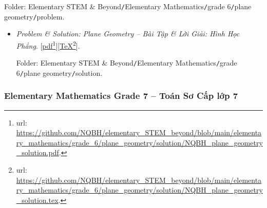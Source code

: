 \documentclass[12pt,twoside]{book}
\begin{document}
\begin{enumerate}
	Folder: {\sf Elementary STEM \& Beyond{\tt/}Elementary Mathematics{\tt/}grade 6{\tt/}plane geometry{\tt/}problem}.
	\begin{itemize}
		\item {\it Problem \& Solution: Plane Geometry -- Bài Tập \& Lời Giải: Hình Học Phẳng}. [\href{https://github.com/NQBH/elementary_STEM_beyond/blob/main/elementary_mathematics/grade_6/plane_geometry/solution/NQBH_plane_geometry_solution.pdf}{pdf}\footnote{{\sc url}: \url{https://github.com/NQBH/elementary_STEM_beyond/blob/main/elementary_mathematics/grade_6/plane_geometry/solution/NQBH_plane_geometry_solution.pdf}.}][\href{https://github.com/NQBH/elementary_STEM_beyond/blob/main/elementary_mathematics/grade_6/plane_geometry/solution/NQBH_plane_geometry_solution.tex}{\TeX}\footnote{{\sc url}: \url{https://github.com/NQBH/elementary_STEM_beyond/blob/main/elementary_mathematics/grade_6/plane_geometry/solution/NQBH_plane_geometry_solution.tex}.}].
		
		Folder: {\sf Elementary STEM \& Beyond{\tt/}Elementary Mathematics{\tt/}grade 6{\tt/}plane geometry{\tt/}solution}.
	\end{itemize}
\end{enumerate}

\subsubsection{Elementary Mathematics Grade 7 -- Toán Sơ Cấp lớp 7}
\end{document}
